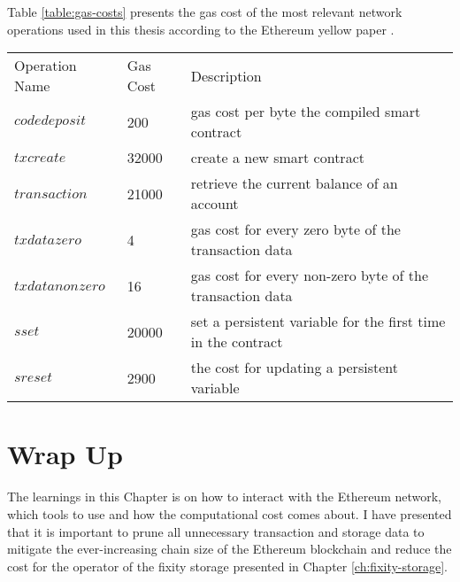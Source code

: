 Table \ref{table:gas-costs} presents the gas cost of the most relevant network operations used in this thesis according to the Ethereum yellow paper \cite[27]{wood2014ethereum}.
\begin{center}
    \begin{tabular}{ l l l }\label{table:gas-costs}
        Operation Name & Gas Cost & Description \\ 
        $codedeposit$ & 200 & gas cost per byte the compiled smart contract \\  
        $txcreate$ & 32000 & create a new smart contract  \\   
        $transaction$ & 21000 & retrieve the current balance of an account \\
        $txdatazero$ & 4 & gas cost for every zero byte of the transaction data  \\   
        $txdatanonzero$ & 16 & gas cost for every non-zero byte of the transaction data  \\   
        $sset$ & 20000 & set a persistent variable for the first time in the contract \\
        $sreset$ & 2900 & the cost for updating a persistent variable 
    \end{tabular}
\end{center}


\section{Wrap Up}
The learnings in this Chapter is on how to interact with the Ethereum network, which tools to use and how the computational cost comes about. I have presented that it is important to prune all unnecessary transaction and storage data to mitigate the ever-increasing chain size of the Ethereum blockchain and reduce the cost for the operator of the fixity storage presented in Chapter \ref{ch:fixity-storage}. 